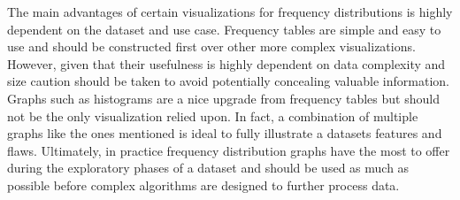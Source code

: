The main advantages of certain visualizations for frequency distributions is highly 
dependent on the dataset and use case. Frequency tables are simple and easy to 
use and should be constructed first over other more complex visualizations. 
However, given that their usefulness is highly dependent on data complexity and 
size caution should be taken to avoid potentially concealing valuable information. 
Graphs such as histograms are a nice upgrade from frequency tables but should not 
be the only visualization relied upon. In fact, a combination of multiple graphs 
like the ones mentioned is ideal to fully illustrate a datasets features and flaws. 
Ultimately, in practice frequency distribution graphs have the most to offer during 
the exploratory phases of a dataset and should be used as much as possible before 
complex algorithms are designed to further process data. 